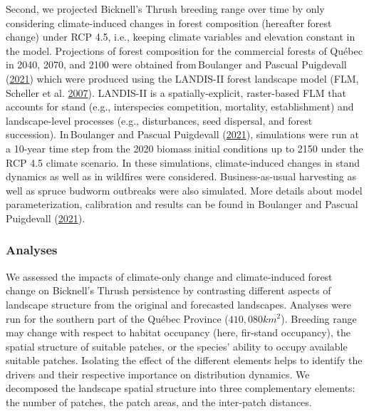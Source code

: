 \documentclass[12pt]{article}
\begin{document}
Second, we projected Bicknell's Thrush breeding range over time by only
considering climate-induced changes in forest composition (hereafter
forest change) under RCP 4.5, i.e., keeping climate variables and
elevation constant in the model. Projections of forest composition for
the commercial forests of Québec in 2040, 2070, and 2100 were obtained
from\,Boulanger and Pascual Puigdevall
(\protect\hyperlink{ref-boulanger_boreal_2021}{2021}) which were
produced using the LANDIS-II forest landscape model (FLM, Scheller et
al. \protect\hyperlink{ref-scheller_design_2007}{2007}). LANDIS-II is a
spatially-explicit, raster-based FLM that accounts for stand (e.g.,
interspecies competition, mortality, establishment) and landscape-level
processes (e.g., disturbances, seed dispersal, and forest succession).
In\,Boulanger and Pascual Puigdevall
(\protect\hyperlink{ref-boulanger_boreal_2021}{2021}), simulations were
run at a 10-year time step from the 2020 biomass initial conditions up
to 2150 under the RCP 4.5 climate scenario. In these simulations,
climate-induced changes in stand dynamics as well as in wildfires were
considered. Business-as-usual harvesting as well as spruce budworm
outbreaks were also simulated. More details about model
parameterization, calibration and results can be found in Boulanger and
Pascual Puigdevall
(\protect\hyperlink{ref-boulanger_boreal_2021}{2021}).

\hypertarget{analyses}{%
\subsubsection{Analyses}\label{analyses}}

We assessed the impacts of climate-only change and climate-induced
forest change on Bicknell's Thrush persistence by contrasting different
aspects of landscape structure from the original and forecasted
landscapes. Analyses were run for the southern part of the Québec
Province (\(410,080 km^2\)). Breeding range may change with respect to
habitat occupancy (here, fir-stand occupancy), the spatial structure of
suitable patches, or the species' ability to occupy available suitable
patches. Isolating the effect of the different elements helps to
identify the drivers and their respective importance on distribution
dynamics. We decomposed the landscape spatial structure into three
complementary elements: the number of patches, the patch areas, and the
inter-patch distances.
\end{document}
